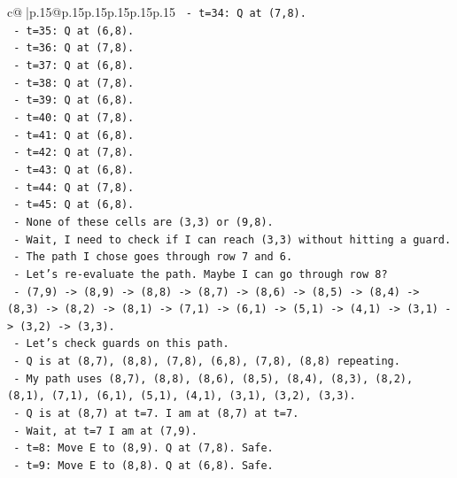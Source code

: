 \documentclass{article}
\begin{document}
{\begin{supertabular}{c@{$\;$}|p{.15\linewidth}@{}p{.15\linewidth}p{.15\linewidth}p{.15\linewidth}p{.15\linewidth}p{.15\linewidth}}
{{{\texttt{            {-}   t=34: Q at (7,8).} \\
\texttt{            {-}   t=35: Q at (6,8).} \\
\texttt{            {-}   t=36: Q at (7,8).} \\
\texttt{            {-}   t=37: Q at (6,8).} \\
\texttt{            {-}   t=38: Q at (7,8).} \\
\texttt{            {-}   t=39: Q at (6,8).} \\
\texttt{            {-}   t=40: Q at (7,8).} \\
\texttt{            {-}   t=41: Q at (6,8).} \\
\texttt{            {-}   t=42: Q at (7,8).} \\
\texttt{            {-}   t=43: Q at (6,8).} \\
\texttt{            {-}   t=44: Q at (7,8).} \\
\texttt{            {-}   t=45: Q at (6,8).} \\
\texttt{            {-}   None of these cells are (3,3) or (9,8).} \\
\texttt{            {-}   Wait, I need to check if I can reach (3,3) without hitting a guard.} \\
\texttt{            {-}   The path I chose goes through row 7 and 6.} \\
\texttt{            {-}   Let's re{-}evaluate the path. Maybe I can go through row 8?} \\
\texttt{            {-}   (7,9) {-}> (8,9) {-}> (8,8) {-}> (8,7) {-}> (8,6) {-}> (8,5) {-}> (8,4) {-}> (8,3) {-}> (8,2) {-}> (8,1) {-}> (7,1) {-}> (6,1) {-}> (5,1) {-}> (4,1) {-}> (3,1) {-}> (3,2) {-}> (3,3).} \\
\texttt{            {-}   Let's check guards on this path.} \\
\texttt{            {-}   Q is at (8,7), (8,8), (7,8), (6,8), (7,8), (8,8) repeating.} \\
\texttt{            {-}   My path uses (8,7), (8,8), (8,6), (8,5), (8,4), (8,3), (8,2), (8,1), (7,1), (6,1), (5,1), (4,1), (3,1), (3,2), (3,3).} \\
\texttt{            {-}   Q is at (8,7) at t=7. I am at (8,7) at t=7.} \\
\texttt{            {-}   Wait, at t=7 I am at (7,9).} \\
\texttt{            {-}   t=8: Move E to (8,9). Q at (7,8). Safe.} \\
\texttt{            {-}   t=9: Move E to (8,8). Q at (6,8). Safe.} \\
}}}
\end{supertabular}}
\end{document}
